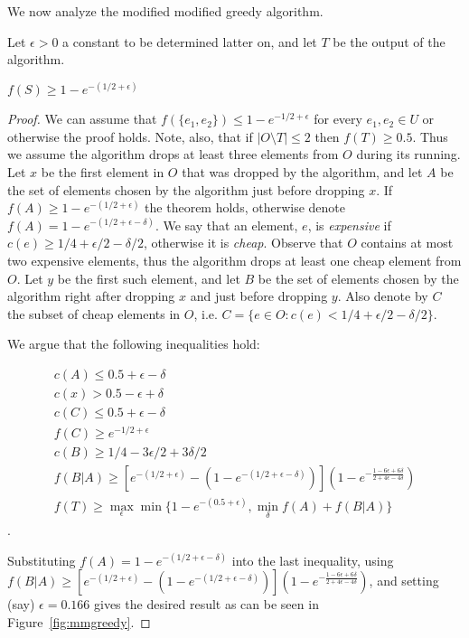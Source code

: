 We now analyze the modified modified greedy algorithm.

Let $\epsilon > 0$ a constant to be determined latter on, and let $T$ be the output of 
the algorithm.

\begin{theorem}
$f(S) \geq 1 - e^{-(1/2 + \epsilon)}$
\end{theorem}

\def\eps{0.166}
\begin{proof}
We can assume that $f(\{e_1, e_2\}) \leq 1 - e^{-1/2 + \epsilon}$ 
for every $e_1, e_2 \in U$ or otherwise the proof holds.
Note, also, that if $|O \setminus T| \leq 2$ then $f(T) \geq 0.5$.
Thus we assume the algorithm drops at least three elements from $O$ during its running.
Let $x$ be the first element in $O$ that was dropped by the algorithm, 
and let $A$ be the set of elements chosen by the algorithm just before dropping $x$.
If $f(A) \geq 1 - e^{-(1/2 + \epsilon)}$ the theorem holds, 
otherwise denote $f(A) = 1 - e^{-(1/2 + \epsilon - \delta)}$.
We say that an element, $e$, is \emph{expensive} if $c(e) \ge 1/4 + \epsilon/2 - \delta/2$, 
otherwise it is \emph{cheap}.
Observe that $O$ contains at most two expensive elements, thus the algorithm drops 
at least one cheap element from $O$. 
Let $y$ be the first such element, and let $B$ be the set of elements chosen by the 
algorithm right after dropping $x$ and just before dropping $y$.
Also denote by $C$ the subset of cheap elements in $O$, 
i.e. $C = \{e \in O : c(e) < 1/4 + \epsilon/2 - \delta/2\}$.

We argue that the following inequalities hold:

\begin{align}
c(A) \leq 0.5 + \epsilon - \delta 
\\
c(x) > 0.5 -\epsilon + \delta
\\
c(C) \leq 0.5 + \epsilon - \delta
\\
f(C) \ge e^{-1/2 + \epsilon}
\\
c(B) \ge 1/4 - 3\epsilon/2 + 3\delta/2
\\
f(B|A) \ge \left[
e^{-(1/2 + \epsilon)}
- (1 - e^{-(1/2 + \epsilon - \delta)})
\right]
(1-e^{-\frac{1-6\epsilon+6\delta}{2+4\epsilon-4\delta}})
\\
f(T) \geq \max_\epsilon \min \{1 - e^{-(0.5 + \epsilon)}, \min_{\delta} f(A) + f(B|A)\}
\end{align}
.

Substituting $f(A) = 1 - e^{-(1/2 + \epsilon - \delta)}$ into the last inequality, 
using $f(B|A) \ge \left[
e^{-(1/2 + \epsilon)}
- (1 - e^{-(1/2 + \epsilon - \delta)})
\right]
(1-e^{-\frac{1-6\epsilon+6\delta}{2+4\epsilon-4\delta}})
$,
and setting (say) $\epsilon = \eps$ gives the desired result 
as can be seen in Figure~\ref{fig:mmgreedy}.

\end{proof}

